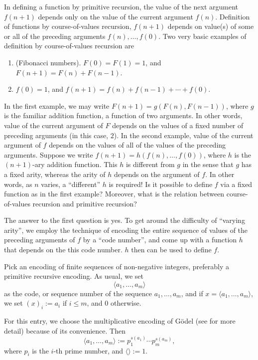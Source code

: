 \documentclass[12pt]{article}
\begin{document}
In defining a function by primitive recursion, the value of the next argument $f(n+1)$ depends only on the value of the current argument $f(n)$.  Definition of functions by course-of-values recursion, $f(n+1)$ depends on value(s) of some or all of the preceding arguments $f(n),\ldots, f(0)$.  Two very basic examples of definition by course-of-values recursion are
\begin{enumerate}
\item (Fibonacci numbers).  $F(0)=F(1)=1$, and $F(n+1)=F(n)+F(n-1)$.
\item $f(0)=1$, and $f(n+1)=f(n)+f(n-1)+\cdots + f(0)$.
\end{enumerate}
In the first example, we may write $F(n+1)= g(F(n),F(n-1))$, where $g$ is the familiar addition function, a function of two arguments.  In other words, value of the current argument of $F$ depends on the values of a fixed number of preceding arguments (in this case, $2$).  In the second example, value of the current argument of $f$ depends on the values of all of the values of the preceding arguments.  Suppose we write $f(n+1)=h(f(n),\ldots, f(0))$, where $h$ is the $(n+1)$-ary addition function.  This $h$ is different from $g$ in the sense that $g$ has a fixed arity, whereas the arity of $h$ depends on the argument of $f$.  In other words, as $n$ varies, a ``different'' $h$ is required!  Is it possible to define $f$ via a fixed function as in the first example?  Moreover, what is the relation between course-of-values recursion and primitive recursion?

The answer to the first question is yes.  To get around the difficulty of ``varying arity'', we employ the technique of encoding the entire sequence of values of the preceding arguments of $f$ by a ``code number'', and come up with a function $h$ that depends on the this code number.  $h$ then can be used to define $f$.

Pick an encoding of finite sequences of non-negative integers, preferably a primitive recursive encoding.  As usual, we set $$\langle a_1, \ldots, a_m \rangle $$ as the code, or sequence number of the sequence $a_1, \ldots, a_m$, and if $x= \langle a_1, \ldots, a_m \rangle$, we set $(x)_i:=a_i$ if $i\le m$, and $0$ otherwise.

For this entry, we choose the multiplicative encoding of G\"{o}del (see  for more detail) because of its convenience.  Then $$\langle a_1, \ldots, a_m \rangle := p_1^{s(a_1)} \cdots p_m^{s(a_m)},$$ where $p_i$ is the $i$-th prime number, and $\langle \rangle:=1$.
\end{document}
